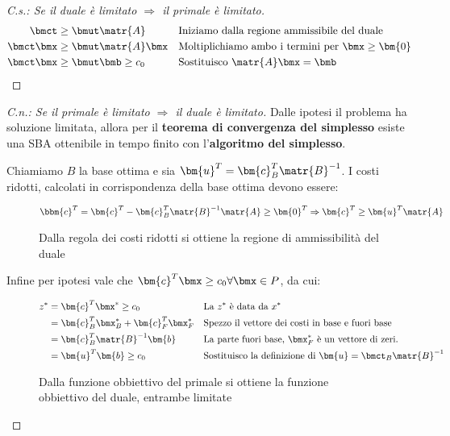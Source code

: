 \documentclass[\main/main.tex]{subfiles}
\begin{document}
\begin{proof}[C.s.: Se il duale è limitato $\Rightarrow$ il primale è limitato]
  \begin{align*}
    \bmct     & \geq \bmut \matr{A}      &  & \text{Iniziamo dalla regione ammissibile del duale}         \\
    \bmct\bmx & \geq \bmut \matr{A}\bmx  &  & \text{Moltiplichiamo ambo i termini per $\bmx \geq \bm{0}$} \\
    \bmct\bmx & \geq \bmut \bmb \geq c_0 &  & \text{Sostituisco $\matr{A}\bmx = \bmb$}
  \end{align*}
\end{proof}
\begin{proof}[C.n.: Se il primale è limitato $\Rightarrow$ il duale è limitato]

  Dalle ipotesi il problema ha soluzione limitata, allora per il \textbf{teorema di convergenza del simplesso} esiste una SBA ottenibile in tempo finito con l'\textbf{algoritmo del simplesso}.

  Chiamiamo $B$ la base ottima e sia $\bm{u}^T = \bm{c}^T_B \matr{B}^{-1}$. I costi ridotti, calcolati in corrispondenza della base ottima devono essere:

  \begin{figure}
    \[
      \bbm{c}^T = \bm{c}^T - \bm{c}_B^T\matr{B}^{-1}\matr{A} \geq \bm{0}^T \Rightarrow \bm{c}^T \geq \bm{u}^T\matr{A}
    \]
    \caption{Dalla regola dei costi ridotti si ottiene la regione di ammissibilità del duale}
  \end{figure}

  Infine per ipotesi vale che $\bm{c}^T \bmx \geq c_0 \forall \bmx \in P$, da cui:

  \begin{figure}
    \begin{align*}
      z^* & = \bm{c}^T\bmx^* \geq c_0                   &  & \text{La $z^*$ è data da $x^*$}                                       \\
          & = \bm{c}_B^T \bmx^*_B + \bm{c}_F^T \bmx^*_F &  & \text{Spezzo il vettore dei costi in base e fuori base}               \\
          & = \bm{c}_B^T\matr{B}^{-1}\bm{b}             &  & \text{La parte fuori base, $\bmx^*_F$ è un vettore di zeri.}          \\
          & = \bm{u}^T\bm{b}  \geq c_0                  &  & \text{Sostituisco la definizione di $\bm{u} = \bmct_B \matr{B}^{-1}$}
    \end{align*}
    \caption{Dalla funzione obbiettivo del primale si ottiene la funzione obbiettivo del duale, entrambe limitate}
  \end{figure}

\end{proof}
\end{document}
